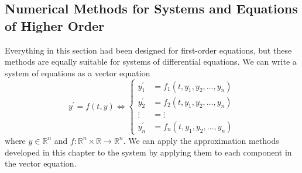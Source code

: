 \documentclass{article}
\begin{document}
  \subsection{Numerical Methods for Systems and Equations of Higher Order}

    Everything in this section had been designed for first-order equations, but these methods are equally suitable for systems of differential equations. We can write a system of equations as a vector equation
    \begin{equation}
      y^\prime = f(t, y) \iff \begin{cases}
          y_1^\prime & = f_1 (t, y_1, y_2, \ldots, y_n) \\
          y_2^\prime & = f_2 (t, y_1, y_2, \ldots, y_n) \\
          \vdots & = \vdots \\
          y_n^\prime & = f_n (t, y_1, y_2, \ldots, y_n)
          \end{cases}
    \end{equation}
    where $y \in \mathbb{R}^n$ and $f: \mathbb{R}^n \times \mathbb{R} \to \mathbb{R}^n$. We can apply the approximation methods developed in this chapter to the system by applying them to each component in the vector equation. 
\end{document}
